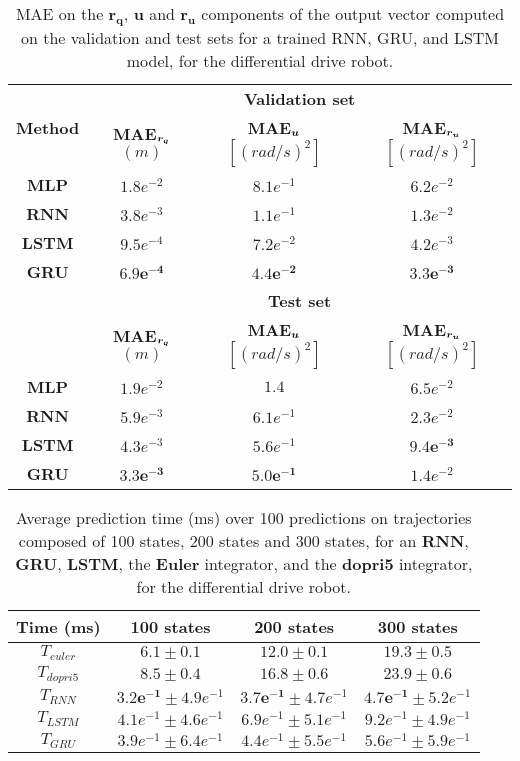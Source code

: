 \begin{table}[h!]
\centering
\begin{tabular}{ | c | c  c  c | }
\hline
    \multirow{2}{*}{\textbf{Method}} & \multicolumn{3}{c|}{\textbf{Validation set}} \\ \cline{2-4}
    & \textbf{MAE$_{\boldsymbol{r_q}}$} $(m)$  & \textbf{MAE$_{\boldsymbol{u}}$} $[(rad/s)^2]$ & \textbf{MAE$_{\boldsymbol{r_u}}$} $[(rad/s)^2]$ \\ \hline
{\textbf{MLP}} & $1.8e^{-2}$ & $8.1e^{-1}$ & $6.2e^{-2}$ \\ 
{\textbf{RNN}} & $3.8e^{-3}$ & $1.1e^{-1}$ & $1.3e^{-2}$ \\ 
{\textbf{LSTM}} & $9.5e^{-4}$ & $7.2e^{-2}$ & $4.2e^{-3}$ \\ 
{\textbf{GRU}} & $\boldsymbol{6.9e^{-4}}$ & $\boldsymbol{4.4e^{-2}}$ & $\boldsymbol{3.3e^{-3}}$ \\ 
\hline
    & \multicolumn{3}{c|}{\textbf{Test set}}\\ \cline{2-4}
    & \textbf{MAE$_{\boldsymbol{r_q}}$} $(m)$  & \textbf{MAE$_{\boldsymbol{u}}$} $[(rad/s)^2]$ & \textbf{MAE$_{\boldsymbol{r_u}}$} $[(rad/s)^2]$ \\ \hline
{\textbf{MLP}} & $1.9e^{-2}$ & $1.4$ & $6.5e^{-2}$ \\ 
{\textbf{RNN}} &  $5.9e^{-3}$ & $6.1e^{-1}$ & $2.3e^{-2}$ \\ 
{\textbf{LSTM}} & $4.3e^{-3}$ & $5.6e^{-1}$ & $\boldsymbol{9.4e^{-3}}$ \\ 
{\textbf{GRU}} & $\boldsymbol{3.3e^{-3}}$ & $5\boldsymbol{.0e^{-1}}$ & $1.4e^{-2}$ \\ 
\hline
\end{tabular}
\caption{
MAE on the $\boldsymbol{r_q}$, $\boldsymbol{u}$ and $\boldsymbol{r_u}$ components of the output vector computed on the validation and test sets for a trained RNN, GRU, and LSTM model, for the differential drive robot.}
    \label{tab:NN_results_table_Q_unic}
\end{table}

\begin{table}[t]
\centering
\begin{tabular}{ | c | c  c  c | }
\hline
    \textbf{Time (ms)} & 100 states  & 200 states & 300 states \\ \hline
    $T_{euler}$ & $6.1 \pm 0.1$ & $12.0 \pm 0.1$ & $19.3 \pm 0.5$ \\ 
$T_{dopri5}$ & $8.5 \pm 0.4$ & $16.8 \pm 0.6$ & $23.9 \pm 0.6$ \\ 
$T_{RNN}$ & $\boldsymbol{3.2e^{-1}} \pm 4.9e^{-1}$ & $\boldsymbol{3.7e^{-1}} \pm 4.7e^{-1}$ & $\boldsymbol{4.7e^{-1}} \pm 5.2e^{-1}$ \\ 
$T_{LSTM}$ & $4.1e^{-1} \pm 4.6e^{-1}$ & $6.9e^{-1} \pm 5.1e^{-1}$ & $9.2e^{-1} \pm 4.9e^{-1}$ \\ 
$T_{GRU}$ & $3.9e^{-1} \pm 6.4e^{-1}$ & $4.4e^{-1} \pm 5.5e^{-1}$ & $5.6e^{-1} \pm 5.9e^{-1}$  \\ \hline
\end{tabular}
\caption{
Average prediction time (ms) over 100 predictions on trajectories composed of 100 states, 200 states and 300 states, for an \textbf{RNN}, \textbf{GRU}, \textbf{LSTM}, the \textbf{Euler} integrator, and the \textbf{dopri5} integrator, for the differential drive robot.}
    \label{tab:timepred_unic}
\end{table}